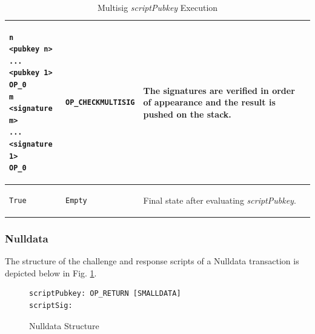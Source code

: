 \begin{table}[!ht]
\begin{minipage}{\textwidth}
\begin{tabular}{| m{95pt} | m{145pt} | m{100pt} |}
\vspace{8pt}
\begin{BVerbatim}[fontsize==\relsize{-4}]
n
<pubkey n>
...
<pubkey 1>
OP_0
m
<signature m>
...
<signature 1>
OP_0
\end{BVerbatim}
\vspace{4pt}
&
\vspace{8pt}
\begin{BVerbatim}[fontsize==\relsize{-4}]
OP_CHECKMULTISIG
\end{BVerbatim} 
\vspace{4pt}
&
The signatures are verified in order of appearance and the result is pushed on the stack.\\ \hline	


\vspace{8pt}
\begin{BVerbatim}[fontsize==\relsize{-4}]
True
\end{BVerbatim}
\vspace{4pt}
&
\vspace{8pt}
\begin{BVerbatim}[fontsize==\relsize{-4}]
Empty
\end{BVerbatim} 
\vspace{4pt}
&
Final state after evaluating \textit{scriptPubkey}.\\ \hline

\end{tabular}
\vspace{5pt}
\caption{Multisig \textit{scriptPubkey} Execution}
\label{tab:P2Multisig2}

\end{minipage}
\end{table}


\subsubsection{Nulldata}
The structure of the challenge and response scripts of a Nulldata transaction is depicted below in Fig. \ref{fig:Nulldata}.

\vspace{-10pt}
\begin{figure}[htbp]

\begin{Verbatim}[fontsize==\relsize{-4}, frame=single]  
scriptPubkey: OP_RETURN [SMALLDATA]
scriptSig:    
\end{Verbatim}

\vspace{-15pt}
\caption{Nulldata Structure}
\label{fig:Nulldata}
\end{figure}
\vspace{-10pt}

